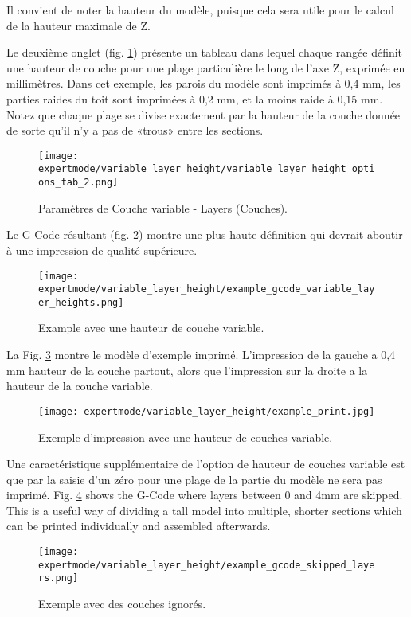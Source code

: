Il convient de noter la hauteur du modèle, puisque cela sera utile pour le calcul de la hauteur maximale de Z.

Le deuxième onglet (fig. \ref{fig:variable_layer_height_options_tab_2}) présente un tableau dans lequel chaque rangée définit une hauteur de couche pour une plage particulière le long de l'axe Z, exprimée en millimètres. Dans cet exemple, les parois du modèle sont imprimés à 0,4 mm, les parties raides du toit sont imprimées à 0,2 mm, et la moins raide à 0,15 mm. Notez que chaque plage se divise exactement par la hauteur de la couche donnée de sorte qu'il n'y a pas de «trous» entre les sections.

\begin{figure}[H]
\centering
\texttt{[image: expertmode/variable\_layer\_height/variable\_layer\_height\_options\_tab\_2.png]}
\caption{Paramètres de Couche variable - Layers (Couches).}
\label{fig:variable_layer_height_options_tab_2}
\end{figure}

Le G-Code résultant (fig. \ref{fig:example_gcode_variable_layer_heights}) montre une plus haute définition qui devrait aboutir à une impression de qualité supérieure.

\begin{figure}[H]
\centering
\texttt{[image: expertmode/variable\_layer\_height/example\_gcode\_variable\_layer\_heights.png]}
\caption{Example avec une hauteur de couche variable.}
\label{fig:example_gcode_variable_layer_heights}
\end{figure}

La Fig. \ref{fig:example_print} montre le modèle d'exemple imprimé.  L'impression de la gauche a 0,4 mm hauteur de la couche partout, alors que l'impression sur la droite a la hauteur de la couche variable.

\begin{figure}[H]
\centering
\texttt{[image: expertmode/variable\_layer\_height/example\_print.jpg]}
\caption{Exemple d'impression avec une hauteur de couches variable.}
\label{fig:example_print}
\end{figure}

Une caractéristique supplémentaire de l'option de hauteur de couches variable est que par la saisie d'un zéro pour une plage de la partie du modèle ne sera pas imprimé.  Fig. \ref{fig:example_gcode_skipped_layers} shows the G-Code where layers between 0 and 4mm are skipped.  This is a useful way of dividing a tall model into multiple, shorter sections which can be printed individually and assembled afterwards.
\begin{figure}[H]
\centering
\texttt{[image: expertmode/variable\_layer\_height/example\_gcode\_skipped\_layers.png]}
\caption{Exemple avec des couches ignorés.}
\label{fig:example_gcode_skipped_layers}
\end{figure}

